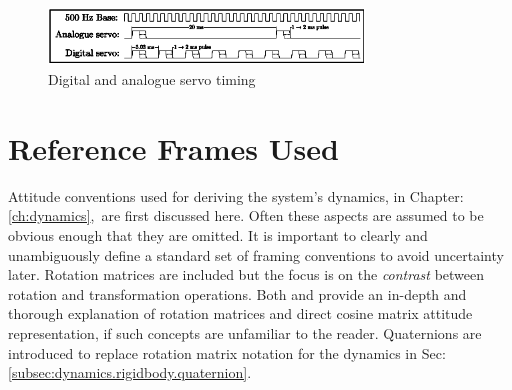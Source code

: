 \begin{figure}
\centering
\includegraphics[width=0.75\textwidth]{figs/servo-timing}
\caption{Digital and analogue servo timing}
\label{fig:servo-timing}
\vspace{-20pt}
\end{figure}
\section{Reference Frames Used}
\label{sec:proto.conventions}
Attitude conventions used for deriving the system's dynamics, in Chapter:\ref{ch:dynamics},~are first discussed here. Often these aspects are assumed to be obvious enough that they are omitted. It is important to clearly and unambiguously define a standard set of framing conventions to avoid uncertainty later. Rotation matrices are included but the focus is on the \emph{contrast} between rotation and transformation operations. Both \cite{spacecraftattitutdequaternions} and \cite{rigidbodylecture} provide an in-depth and thorough explanation of rotation matrices and direct cosine matrix attitude representation, if such concepts are unfamiliar to the reader. Quaternions are introduced to replace rotation matrix notation for the dynamics in Sec:\ref{subsec:dynamics.rigidbody.quaternion}.
